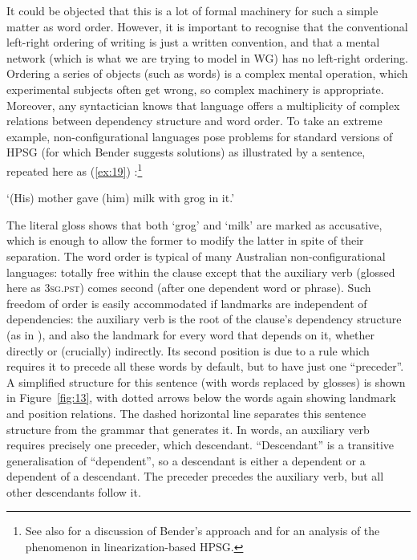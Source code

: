 \documentclass[output=paper,biblatex,babelshorthands,newtxmath,draftmode,colorlinks,citecolor=brown]{langscibook}
\begin{document}
\largerpage[-1]
It could be objected that this is a lot of formal machinery for such a simple matter as word order. However, it is important to recognise that the conventional left-right ordering of writing is just a written convention, and that a mental network (which is what we are trying to model in WG) has no left-right ordering. Ordering a series of objects (such as words) is a complex mental operation, which experimental subjects often get wrong, so complex machinery is appropriate.
Moreover, any syntactician knows that language offers a multiplicity of complex relations between
dependency structure and word order. To take an extreme example, non-configurational languages pose
problems for standard versions of HPSG (for which Bender suggests solutions) as illustrated by a
 sentence, repeated here as (\ref{ex:19}) \parencites[]{Bender2008a}{Nordlinger1998}:\footnote{
  See also  for a discussion of
    Bender's approach and  for an analysis
    of the phenomenon in linearization-based HPSG.
}

\begin{exe}
\ex \label{ex:19}
\glt `(His) mother gave (him) milk with grog in it.'
\end{exe}

\largerpage
\noindent
The literal gloss shows that both `grog' and `milk' are marked as accusative, which is enough to allow the former to modify the latter in spite of their separation. The word order is typical of many Australian non-configurational languages: totally free within the clause except that the auxiliary verb (glossed here as \textsc{3sg.pst}) comes second (after one dependent word or phrase). Such freedom of order is easily accommodated if landmarks are independent of dependencies: the auxiliary verb is the root of the clause's dependency structure (as in ), and also the landmark for every word that depends on it, whether directly or (crucially) indirectly. Its second position is due to a rule which requires it to precede all these words by default, but to have just one ``preceder''. A simplified structure for this sentence (with  words replaced by  glosses) is shown in Figure~\ref{fig:13}, with dotted arrows below the words again showing landmark and position relations. The dashed horizontal line separates this sentence structure from the grammar that generates it. In words, an auxiliary verb requires precisely one preceder, which  descendant. ``Descendant'' is a transitive generalisation of ``dependent'', so a descendant is either a dependent or a dependent of a descendant. The preceder precedes the auxiliary verb, but all other descendants follow it.
\end{document}
